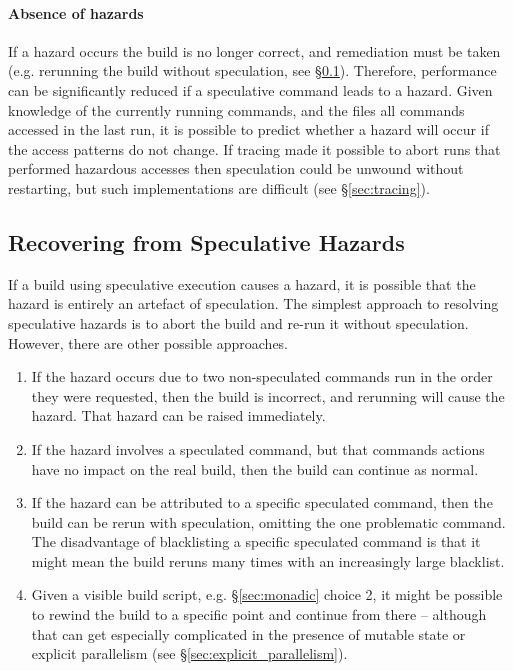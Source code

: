 \paragraph{Absence of hazards} If a hazard occurs the build is no longer correct, and remediation must be taken (e.g. rerunning the build without speculation, see \S\ref{sec:recovering}). Therefore, performance can be significantly reduced if a speculative command leads to a hazard. Given knowledge of the currently running commands, and the files all commands accessed in the last run, it is possible to predict whether a hazard will occur if the access patterns do not change. If tracing made it possible to abort runs that performed hazardous accesses then speculation could be unwound without restarting, but such implementations are difficult (see \S\ref{sec:tracing}).

\subsection{Recovering from Speculative Hazards}
\label{sec:recovering}

If a build using speculative execution causes a hazard, it is possible that the hazard is entirely an artefact of speculation. The simplest approach to resolving speculative hazards is to abort the build and re-run it without speculation. However, there are other possible approaches.

\begin{enumerate}
\item If the hazard occurs due to two non-speculated commands run in the order they were requested, then the build is incorrect, and rerunning will cause the hazard. That hazard can be raised immediately.
\item If the hazard involves a speculated command, but that commands actions have no impact on the real build, then the build can continue as normal.
\item If the hazard can be attributed to a specific speculated command, then the build can be rerun with speculation, omitting the one problematic command. The disadvantage of blacklisting a specific speculated command is that it might mean the build reruns many times with an increasingly large blacklist.
\item Given a visible build script, e.g. \S\ref{sec:monadic} choice 2, it might be possible to rewind the build to a specific point and continue from there -- although that can get especially complicated in the presence of mutable state or explicit parallelism (see \S\ref{sec:explicit_parallelism}).
\end{enumerate}

